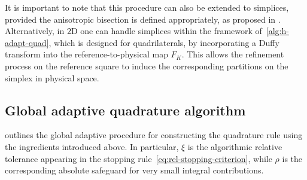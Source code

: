 \documentclass[oneside,reqno,11pt,a4paper]{amsart}
\theoremstyle{definition}
\begin{document}
It is important to note that this procedure can also be extended to simplices,
provided the anisotropic bisection is defined appropriately, as proposed in
\cite{Genz1991simplex,GenzCools2003simplex}. Alternatively, in $2$D one can handle simplices within
the framework of~\cref{alg:h-adapt-quad}, which is designed for quadrilaterals,
by incorporating a Duffy transform into the reference-to-physical map $F_K$.
This allows the refinement process on the reference square to induce the
corresponding partitions on the simplex in physical space.

\subsection{Global adaptive quadrature algorithm} \label{sec:adaptive-quad-algo}
 outlines the global adaptive procedure for
constructing the quadrature rule using the ingredients introduced above.
In particular, $\xi$ is the algorithmic relative tolerance appearing in the
stopping rule~\eqref{eq:rel-stopping-criterion}, while $\rho$ is the
corresponding absolute safeguard for very small integral contributions.
\end{document}
